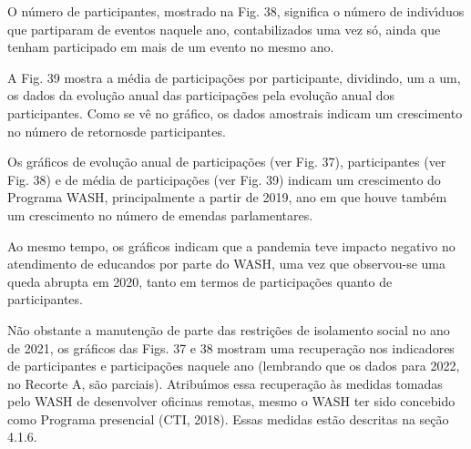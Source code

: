 \documentclass[
12pt,		%
openright,	%
twoside,  %
a4paper,			%
chapter=TITLE,		%
english,			%
french,				%
spanish,			%
brazil				%
]{USPSC-classe/USPSC}
\begin{document}
O n\'umero de participantes, mostrado na Fig. 38, significa o n\'umero de indiv\'{\i}duos que partiparam de eventos naquele ano, contabilizados uma vez s\'o, ainda que tenham participado em mais de um evento no mesmo ano.









A Fig. 39 mostra a m\'edia de participa\c{c}\~oes por participante, dividindo, um a um, os dados da evolu\c{c}\~ao anual das participa\c{c}\~oes pela evolu\c{c}\~ao anual dos participantes. Como se v\^e no gr\'afico, os dados amostrais indicam um crescimento no n\'umero de \textquotedbl retornos\textquotedbl  de participantes.









Os gr\'aficos de evolu\c{c}\~ao anual de participa\c{c}\~oes (ver Fig. 37), participantes (ver Fig. 38) e de m\'edia de participa\c{c}\~oes (ver Fig. 39) indicam um crescimento do Programa WASH, principalmente a partir de 2019, ano em que houve tamb\'em um crescimento no n\'umero de emendas parlamentares.









Ao mesmo tempo, os gr\'aficos indicam que a pandemia teve impacto negativo no atendimento de educandos por parte do WASH, uma vez que observou-se uma queda abrupta em 2020, tanto em termos de participa\c{c}\~oes quanto de participantes.









N\~ao obstante a manuten\c{c}\~ao de parte das restri\c{c}\~oes de isolamento social no ano de 2021, os gr\'aficos das Figs. 37 e 38 mostram uma recupera\c{c}\~ao nos indicadores de participantes e participa\c{c}\~oes naquele ano (lembrando que os dados para 2022, no Recorte A, s\~ao parciais). Atribu\'{\i}mos essa recupera\c{c}\~ao \`as medidas tomadas pelo WASH de desenvolver oficinas remotas, mesmo o WASH ter sido concebido como Programa presencial  (CTI, 2018). Essas medidas est\~ao descritas na se\c{c}\~ao 4.1.6.
\end{document}

